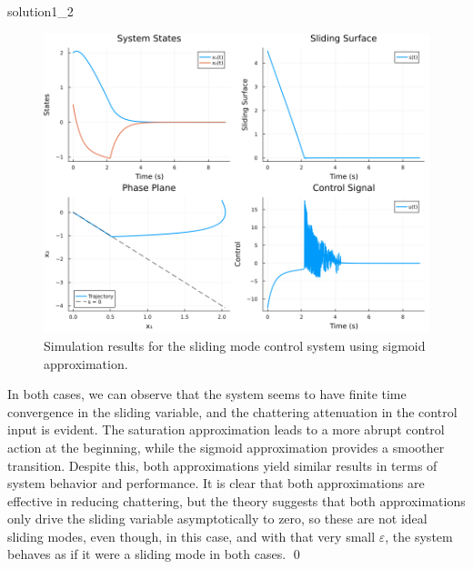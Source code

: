 \begin{solution}{}{solution1_2}
\begin{enumerate}[label=\textbf{\alph*)}, start=3]
\begin{enumerate}[label=\textbf{\roman*)}]
			            \begin{figure}[H]
				            \centering
				            \includegraphics[width=1\textwidth]{img/problem1_2_sigmoid.png}
				            \caption{Simulation results for the sliding mode control system using sigmoid approximation.}
				            \label{fig:problem1_2_sig}
			            \end{figure}
		      \end{enumerate}
	\end{enumerate}
	In both cases, we can observe that the system seems to have finite time convergence in the sliding variable, and the chattering attenuation in the control input is evident. The saturation approximation leads to a more abrupt control action at the beginning, while the sigmoid approximation provides a smoother transition. Despite this, both approximations yield similar results in terms of system behavior and performance. It is clear that both approximations are effective in reducing chattering, but the theory suggests that both approximations only drive the sliding variable asymptotically to zero, so these are not ideal sliding modes, even though, in this case, and with that very small $\varepsilon$, the system behaves as if it were a sliding mode in both cases.
	\qed
\end{solution}
